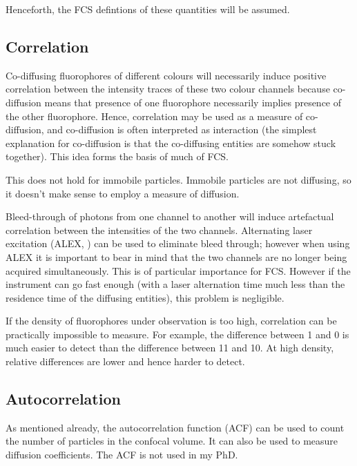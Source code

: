 \documentclass[12pt,]{book}
\theoremstyle{definition}
\theoremstyle{definition}
\theoremstyle{definition}
\theoremstyle{remark}
\let\BeginKnitrBlock\begin \let\EndKnitrBlock\end
\begin{document}
\BeginKnitrBlock{remark}
\iffalse{} {Remark. } \fi{}Henceforth, the FCS defintions of these
quantities will be assumed.
\EndKnitrBlock{remark}

\subsection{Correlation}\label{correlation}

Co-diffusing fluorophores of different colours will necessarily induce
positive correlation between the intensity traces of these two colour
channels because co-diffusion means that presence of one fluorophore
necessarily implies presence of the other fluorophore. Hence,
correlation may be used as a measure of co-diffusion, and co-diffusion
is often interpreted as interaction (the simplest explanation for
co-diffusion is that the co-diffusing entities are somehow stuck
together). This idea forms the basis of much of FCS.

This does not hold for immobile particles. Immobile particles are not
diffusing, so it doesn't make sense to employ a measure of diffusion.

Bleed-through of photons from one channel to another will induce
artefactual correlation between the intensities of the two channels.
Alternating laser excitation (ALEX, \citet{ALEX}) can be used to
eliminate bleed through; however when using ALEX it is important to bear
in mind that the two channels are no longer being acquired
simultaneously. This is of particular importance for FCS. However if the
instrument can go fast enough (with a laser alternation time much less
than the residence time of the diffusing entities), this problem is
negligible.

If the density of fluorophores under observation is too high,
correlation can be practically impossible to measure. For example, the
difference between 1 and 0 is much easier to detect than the difference
between 11 and 10. At high density, relative differences are lower and
hence harder to detect.

\subsection{Autocorrelation}\label{autocorrelation}

As mentioned already, the autocorrelation function (ACF) can be used to
count the number of particles in the confocal volume. It can also be
used to measure diffusion coefficients. The ACF is not used in my PhD.
\end{document}
